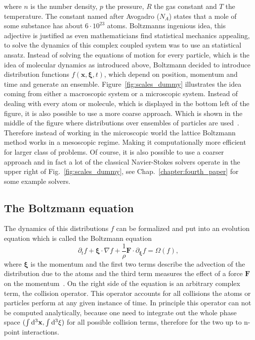 where $n$ is the number density, $p$ the pressure, $R$ the gas constant and $T$ the temperature.
The constant named after Avogadro ($N_A$) states that a mole of some substance has about $6 \cdot 10^{23}$ atoms.
Boltzmanns ingenious idea, this adjective is justified as even mathematicians find statistical mechanics appealing, to solve the dynamics of this complex coupled system was to use an statistical ansatz.
Instead of solving the equations of motion for every particle, which is the idea of molecular dynamics as introduced above, Boltzmann decided to introduce distribution functions $f(\mathbf{x},{\boldsymbol\xi},t)$, which depend on position, momentum and time and generate an ensemble.
Figure~\ref{fig:scales_dummy} illustrates the idea coming from either a macroscopic system or a microscopic system.
Instead of dealing with every atom or molecule, which is displayed in the bottom left of the figure, it is also possible to use a more coarse approach. 
Which is shown in the middle of the figure where distributions over ensembles of particles are used~\cite{raabe2004overview}.
Therefore instead of working in the microscopic world the lattice Boltzmann method works in a mesoscopic regime.
Making it computationally more efficient for larger class of problems.
Of course, it is also possible to use a coarser approach and in fact a lot of the classical Navier-Stokes solvers operate in the upper right of Fig.~\ref{fig:scales_dummy}, see Chap.~\ref{chapter:fourth_paper} for some example solvers.

\subsection{The Boltzmann equation}
The dynamics of this distributions $f$ can be formalized and put into an evolution equation which is called the Boltzmann equation
\begin{equation}\label{eq:boltzmann_eq}
    \partial_t f + {\boldsymbol\xi}\cdot\nabla f + \frac{1}{\rho}\mathbf{F}\cdot\partial_{{\boldsymbol\xi}}f = \Omega(f), 
\end{equation}
where ${\boldsymbol\xi}$ is the momentum and the first two terms describe the advection of the distribution due to the atoms and the third term measures the effect of a force $\mathbf{F}$ on the momentum~\cite{krugerLatticeBoltzmannMethod2017}.
On the right side of the equation is an arbitrary complex term, the collision operator.
This operator accounts for all collisions the atoms or particles perform at any given instance of time.
In principle this operator can not be computed analytically, because one need to integrate out the whole phase space $(\int \mathop{}\!\mathrm{d}^3\mathbf{x}, \int \mathop{}\!\mathrm{d}^3\xi)$ for all possible collision terms, therefore for the two up to n-point interactions. 

